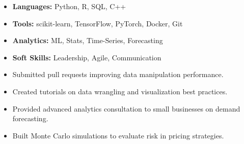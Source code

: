 \documentclass[10pt,a4paper]{altacv}
\begin{document}
\begin{itemize}[leftmargin=*]
  \item \textbf{Languages:} Python, R, SQL, C++
  \item \textbf{Tools:} scikit-learn, TensorFlow, PyTorch, Docker, Git
  \item \textbf{Analytics:} ML, Stats, Time-Series, Forecasting
  \item \textbf{Soft Skills:} Leadership, Agile, Communication
\end{itemize}

\begin{itemize}
  \item Submitted pull requests improving data manipulation performance.
  \item Created tutorials on data wrangling and visualization best practices.
\end{itemize}

\divider

\begin{itemize}
  \item Provided advanced analytics consultation to small businesses on demand forecasting.
  \item Built Monte Carlo simulations to evaluate risk in pricing strategies.
\end{itemize}
\end{document}
